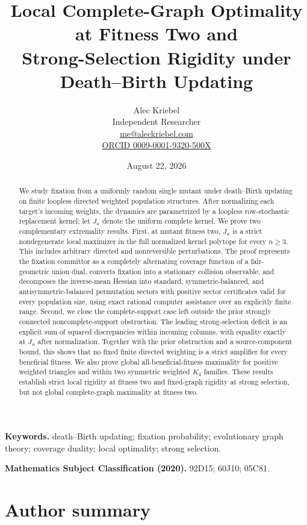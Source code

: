 \documentclass[11pt]{article}
\title{Local Complete-Graph Optimality at Fitness Two and\\
Strong-Selection Rigidity under Death--Birth Updating}
\author{Alec Kriebel\\Independent Researcher\\
\href{mailto:me@aleckriebel.com}{me@aleckriebel.com}\\
\href{https://orcid.org/0009-0001-9320-500X}{ORCID 0009-0001-9320-500X}}
\date{August 22, 2026}
\begin{document}
\maketitle

\begin{abstract}
We study fixation from a uniformly random single mutant under death--Birth
updating on finite loopless directed weighted population structures.  After
normalizing each target's incoming weights, the dynamics are parametrized by
a loopless row-stochastic replacement kernel; let $J_n$ denote the uniform
complete kernel.  We prove two complementary extremality results.  First, at
mutant fitness two, $J_n$ is a strict nondegenerate local maximizer in the
full normalized kernel polytope for every $n\ge3$.  This includes arbitrary
directed and nonreversible perturbations.  The proof represents
the fixation committor as a completely alternating coverage function of a
fair-geometric union dual, converts fixation into a stationary collision
observable, and decomposes the inverse-mean Hessian into standard,
symmetric-balanced, and antisymmetric-balanced permutation sectors with
positive sector certificates valid for every population size, using exact
rational computer assistance over an explicitly finite range.
Second, we close the complete-support case left outside the prior strongly
connected noncomplete-support obstruction.  The leading
strong-selection deficit is an explicit sum of squared discrepancies within
incoming columns, with equality exactly at $J_n$ after normalization.
Together with the prior obstruction and a source-component bound,
this shows that no fixed finite directed weighting is a strict amplifier for
every beneficial fitness.  We also prove
global all-beneficial-fitness maximality for positive weighted triangles and
within two symmetric weighted $K_4$ families.  These results establish strict local
rigidity at fitness two and fixed-graph rigidity at strong selection, but
not global complete-graph maximality at fitness two.
\end{abstract}

\noindent\textbf{Keywords.}
death--Birth updating; fixation probability; evolutionary graph theory;
coverage duality; local optimality; strong selection.

\medskip
\noindent\textbf{Mathematics Subject Classification (2020).}
92D15; 60J10; 05C81.

\section*{Author summary}
\end{document}
